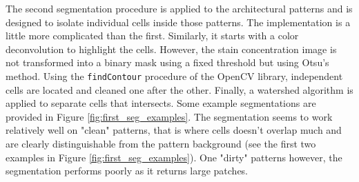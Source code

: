 The second segmentation procedure is applied to the architectural patterns and is designed to isolate individual cells inside those patterns. The implementation is a little more complicated than the first. Similarly, it starts with a color deconvolution to highlight the cells. However, the stain concentration image is not transformed into a binary mask using a fixed threshold but using Otsu's method. Using the \texttt{findContour} procedure of the OpenCV library, independent cells are located and cleaned one after the other. Finally, a watershed algorithm is applied to separate cells that intersects. Some example segmentations are provided in Figure \ref{fig:first_seg_examples}. The segmentation seems to work relatively well on "clean" patterns, that is where cells doesn't overlap much and are clearly distinguishable from the pattern background (see the first two examples in Figure \ref{fig:first_seg_examples}). One "dirty" patterns however, the segmentation performs poorly as it returns large patches.  

